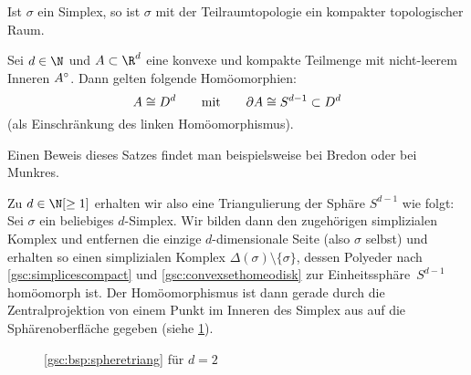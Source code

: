 \begin{thKorollar}
    \label{gsc:simplicescompact}
    Ist $\sigma$ ein Simplex, so ist $\sigma$ mit der Teilraumtopologie ein
    kompakter topologischer Raum.
\end{thKorollar}

\begin{thSatz}
    \label{gsc:convexsethomeodisk}
    Sei $d\in\N$ und $A\subset\R^d$ eine konvexe und kompakte Teilmenge mit
    nicht-leerem Inneren $A^\circ$. Dann gelten folgende Homöomorphien:
    \[ A\cong D^d \qquad\text{mit}\qquad 
        \partial A \cong S^{d-1} \subset D^d 
    \]
    (als Einschränkung des linken Homöomorphismus).
\end{thSatz}

Einen Beweis dieses Satzes findet man beispielsweise bei
Bredon\cite[Ch.\,I,.]{bookc:bredon93} oder bei
Munkres\cite[Ch.\,1,\;\S1,]{bookc:munkres84}.

\begin{thBeispiel}\label{gsc:bsp:spheretriang}
    Zu $d\in\N[\geq1]$ erhalten wir also eine Triangulierung der Sphäre
    $S^{d-1}$ wie folgt: Sei $\sigma$ ein beliebiges $d$-Simplex. Wir bilden
    dann den zugehörigen simplizialen Komplex und entfernen die einzige
    $d$-dimensionale Seite (also $\sigma$ selbst) und erhalten so einen
    simplizialen Komplex $\Delta(\sigma)\setminus\{\sigma\}$, dessen Polyeder
    nach \cref{gsc:simplicescompact} und \cref{gsc:convexsethomeodisk} zur
    Einheitssphäre~$S^{d-1}$ homöomorph ist. Der Homöomorphismus ist dann
    gerade durch die Zentralprojektion von einem Punkt im Inneren des Simplex
    aus auf die Sphärenoberfläche gegeben (siehe \cref{gsc:fig:spheretriang}).
\end{thBeispiel}

\begin{figure}
    \centering
    \caption{\cref{gsc:bsp:spheretriang} für $d=2$}
    \label{gsc:fig:spheretriang}
\end{figure}

